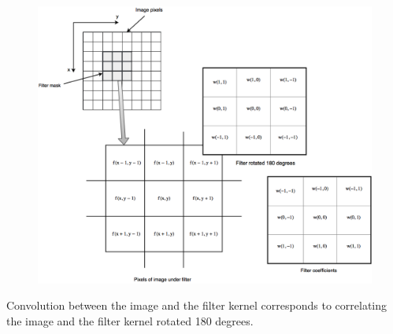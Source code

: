 \begin{figure}[H]
	\centering
	\includegraphics[width=.8\linewidth]{fig/digimageproc.png}
	\caption{}
	\label{fig:spatial_filter}
\end{figure}
Convolution between the image and the filter kernel corresponds to correlating the image and the filter kernel rotated 180 degrees.
